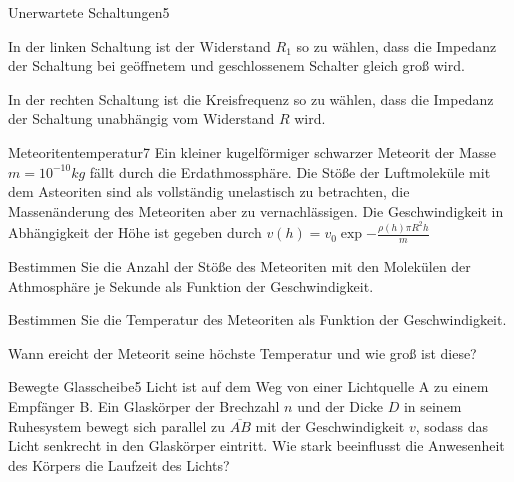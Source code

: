 \begin{problem}{Unerwartete Schaltungen}{5}
 \begin{abcenum}
  \item In der linken Schaltung ist der Widerstand $R_1$ so zu wählen, dass die Impedanz der Schaltung bei geöffnetem und geschlossenem Schalter gleich groß wird.
  \item In der rechten Schaltung ist die Kreisfrequenz so zu wählen, dass die Impedanz der Schaltung unabhängig vom Widerstand $R$ wird.
 \end{abcenum}
\end{problem}

\begin{problem}{Meteoritentemperatur}{7}
Ein kleiner kugelförmiger schwarzer Meteorit der Masse $m=10^{-10}\unit{kg}$ fällt durch die Erdathmossphäre. Die Stöße der Luftmoleküle mit dem Asteoriten sind als vollständig unelastisch zu betrachten, die Massenänderung des Meteoriten aber zu vernachlässigen. Die Geschwindigkeit in Abhängigkeit der Höhe ist gegeben durch $v(h)=v_0\exp{-\frac{\rho(h)\pi R^2h}{m}}$
 \begin{abcenum}
  \item Bestimmen Sie die Anzahl der Stöße des Meteoriten mit den Molekülen der Athmosphäre je Sekunde als Funktion der Geschwindigkeit.
  \item Bestimmen Sie die Temperatur des Meteoriten als Funktion der Geschwindigkeit.
  \item Wann ereicht der Meteorit seine höchste Temperatur und wie groß ist diese?
 \end{abcenum}
\end{problem}

\begin{problem}{Bewegte Glasscheibe}{5}
Licht ist auf dem Weg von einer Lichtquelle A zu einem Empfänger B. Ein Glaskörper der Brechzahl $n$ und der Dicke $D$ in seinem Ruhesystem bewegt sich parallel zu $\overline{AB}$ mit der Geschwindigkeit $v$, sodass das Licht senkrecht in den Glaskörper eintritt. Wie stark beeinflusst die Anwesenheit des Körpers die Laufzeit des Lichts?
\end{problem}

